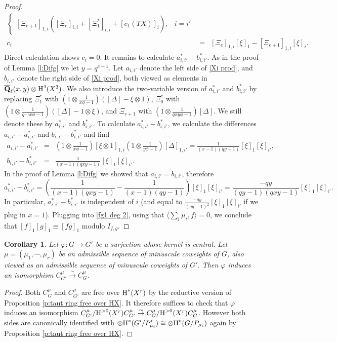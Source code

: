 \documentclass[reqno]{amsart}
\numberwithin{equation}{subsection}
\newtheorem{cor}[subsubsection]{Corollary}
\theoremstyle{definition}
\newcommand{\Qlbar}{\overline{\Q}_\ell}
\renewcommand{\j}[1]{\langle{#1}\rangle}
\newcommand\ot{\otimes}
\newcommand{\cohog}[2]{\textup{H}^{#1}({#2})}     %
\newcommand{\isom}{\stackrel{\sim}{\to}}
\newcommand\D\Delta
\newcommand{\ph}{\varphi}
\newcommand{\Q}{\mathbf{Q}}
\begin{document}
\begin{proof}
\begin{eqnarray*}
\begin{cases}
            [\Xi_{e+1}]_{1,i}([\Xi_{e}]_{i,i}+[\Xi_1^*]_{i,i}+[c_1(TX)]_i), & i=i'
        \end{cases}\\
        c_i&=&[\Xi_{e}]_{1,i}[\xi]_1-[\Xi_{e+1}]_{1,i}[\xi]_i.
    \end{eqnarray*}
    Direct calculation shows $c_i=0$. It remains to calculate $a^*_{i,i'}-b^*_{i,i'}$. As in the proof of Lemma \ref{l:Difg} we let $y=q^{e-1}$. Let $a_{i,i'}$ denote the left side of \eqref{Xi prod}, and $b_{i,i'}$ denote the right side of \eqref{Xi prod}, both viewed as elements in $\Qlbar(x,y)\ot \cohog{4}{X^3}$. We also introduce the two-variable version of $a^*_{i,i'}$ and $b^*_{i,i'}$ by replacing $\Xi^*_1$ with $\left(1\ot \frac{1}{x\phi-1}\right)([\D]-\xi\ot 1)$, $\Xi^*_0$ with $\left(1\ot \frac{1}{q^{-1}x\phi-1}\right)([\D]-1\ot \xi)$, and $\Xi_{e+1}$ with $\left(1\ot \frac{1}{qxy\phi-1}\right)[\D]$. We still denote these by $a^*_{i,i'}$ and $b^*_{i,i'}$. To calculate $a^*_{i,i'}-b^*_{i,i'}$, we calculate the differences $a_{i,i'}-a^*_{i,i'}$ and $b_{i,i'}-b^*_{i,i'}$ and find
    \begin{eqnarray*}
        a_{i,i'}-a^*_{i,i'}&=&\left(1\ot \frac{1}{x\phi-1}\right)[\xi\ot1]_{1,i}\left(1\ot\frac{1}{y\phi-1}\right)[\D]_{1,i'}=\frac{1}{(x-1)(qy-1)}[\xi]_1[\xi]_{i'},\\
        b_{i,i'}-b^*_{i,i'}&=&\frac{1}{(x-1)(qxy-1)}[\xi]_1[\xi]_{i'}.
    \end{eqnarray*}
    In the proof of Lemma \ref{l:Difg} we showed that $a_{i,i'}=b_{i,i'}$, therefore
    \begin{equation*}
        a_{i,i'}^*-b_{i,i'}^*=\left(\frac{1}{(x-1)(qxy-1)}-\frac{1}{(x-1)(qy-1)}\right)[\xi]_1[\xi]_{i'}=\frac{-qy}{(qy-1)(qxy-1)}[\xi]_1[\xi]_{i'}.
    \end{equation*}
    In particular, $a_{i,i'}^*-b_{i,i'}^*$ is independent of $i$ (and equal to $\frac{-qy}{(qy-1)^2}[\xi]_1[\xi]_{i'}$ if we plug in $x=1$). Plugging into \eqref{fg1 deg 2}, using that $\j{\sum_i\mu_i,f}=0$, we conclude that $[f]_1[g]_1\equiv [fg]_1$ modulo $I_{f,g}$.
\end{proof}

\begin{cor}
    Let $\ph: G\to G'$ be a surjection whose kernel is central. Let $\mu=(\mu_1,\cdots, \mu_r)$ be an admissible sequence of minuscule coweights of $G$, also viewed as an admissible sequence of minuscule coweights of $G'$. Then $\ph$ induces an isomorphism $C^\mu_{G'}\isom C^\mu_G$.
\end{cor}
\begin{proof}
    Both $C^\mu_G$ and $C^\mu_{G'}$ are free over $\cohog{*}{X^r}$ by the reductive version of Proposition \ref{p:taut ring free over HX}. It therefore suffices to check that $\ph$ induces an isomorphism $C^\mu_{G'}/\cohog{>0}{X^r}C^\mu_{G'}\isom C^\mu_{G}/\cohog{>0}{X^r}C^\mu_{G}$. However both sides are canonically identified with $\ot\cohog{*}{G'/P'_{\mu_i}}\cong \ot\cohog{*}{G/P_{\mu_i}}$ again by Proposition \ref{p:taut ring free over HX}.
\end{proof}
\end{document}
